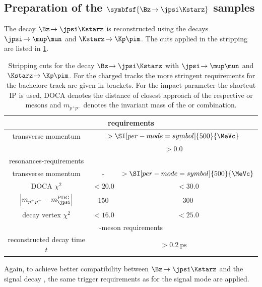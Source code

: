 \subsection[head={Preparation of the $\Bz\!\to\jpsi\Kstarz$ samples},tocentry={Preparation of the $\Bz\!\to\jpsi\Kstarz$ samples}]{Preparation of the $\symbfsf{\Bz\!\to\jpsi\Kstarz}$ samples}
\label{sec:PrepBd2JpsiKstSample}


The decay $\Bz\!\to\jpsi\Kstarz$ is reconstructed using the decays $\jpsi\!\to\mup\mun$ and $\Kstarz\!\to\Kp\pim$.
The cuts applied in the stripping are listed in \cref{tab:JpsiKstStripping}.
\begin{table}[tbp]
	\centering
	\caption{Stripping cuts for the decay $\Bz\!\to\jpsi\Kstarz$ with $\jpsi\!\to\mup\mun$ and $\Kstarz\!\to\Kp\pim$.
	For the charged tracks the more stringent requirements for the bachelore track are given in brackets.
	For the impact parameter the shortcut IP is used, DOCA denotes the distance of closest approach of the respective \Kstarz or \jpsi mesons and $m_{p^+p^-}$ denotes the invariant mass of the \mup\mun or \Kp\pim combination.}
	\begin{tabular}{ccc}
		\toprule
		\multicolumn{3}{c}{\muon requirements}\\
		\midrule
		transverse momentum \pt 	& \multicolumn{2}{c}{$>\SI[per-mode=symbol]{500}{\MeVc}$} \\
		\dllmupi					& \multicolumn{2}{c}{$>0.0$} \\
		\midrule
		resonances-requirements & \jpsi & \Kstarz\\
		\midrule
		transverse momentum \pt 							& - 								& $>\SI[per-mode=symbol]{500}{\MeVc}$ \\
		DOCA $\chi^2$										& $<20.0$ 							& $<30.0$ \\
		$\left|m_{p^+p^-}-m_{\jpsi}^{\text{PDG}}\right|$	& \SI[per-mode=symbol]{150}{\MeVcc} & \SI[per-mode=symbol]{300}{\MeVcc} \\
		decay vertex $\chi^2$ 									& $<16.0$ 						& $<25.0$ \\
		\midrule
		\multicolumn{3}{c}{\Bz-meson requirements}\\
		\midrule
		reconstructed decay time $t$ 	& \multicolumn{2}{c}{$>\SI{0.2}{\pico\second}$} \\
		\bottomrule
	\end{tabular}
	\label{tab:JpsiKstStripping}
\end{table}
Again, to achieve  better compatibility between $\Bz\!\to\jpsi\Kstarz$ and the signal decay \BdToDpi, the same trigger requirements as for the signal mode are applied.
